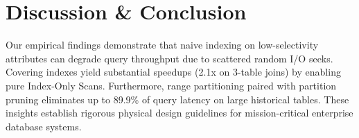\documentclass[journal]{IEEEtran}
\begin{document}
\section{Discussion \& Conclusion}
Our empirical findings demonstrate that naive indexing on low-selectivity attributes can degrade query throughput due to scattered random I/O seeks. Covering indexes yield substantial speedups (2.1x on 3-table joins) by enabling pure Index-Only Scans. Furthermore, range partitioning paired with partition pruning eliminates up to 89.9\% of query latency on large historical tables. These insights establish rigorous physical design guidelines for mission-critical enterprise database systems.



\end{document}
